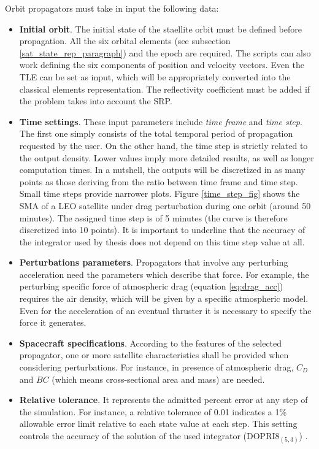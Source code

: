 Orbit propagators must take in input the following data:
\begin{itemize}
    \item \textbf{Initial orbit}. The initial state of the staellite orbit must be defined before propagation.
          All the six orbital elements (see subsection \ref{sat_state_rep_paragraph}) and the epoch are required. 
          The scripts can also work defining the six components of position and velocity vectors.
          Even the TLE can be set as input, which will be appropriately converted into the classical elements representation.  
          The reflectivity coefficient must be added if the problem takes into account the SRP.
    \item \textbf{Time settings}. These input parameters include \textit{time frame} and \textit{time step}.
          The first one simply consists of the total temporal period of propagation requested by the user.
          On the other hand, the time step is strictly related to the output density.
          Lower values imply more detailed results, as well as longer computation times.
          In a nutshell, the outputs will be discretized in as many points as those deriving from the ratio between time frame and time step.
          Small time steps provide narrower plots. 
          Figure \ref{time_step_fig} shows the SMA of a LEO satellite under drag perturbation during one orbit (around 50 minutes). 
          The assigned time step is of 5 minutes (the curve is therefore discretized into 10 points).
          It is important to underline that the accuracy of the integrator used by thesis does not depend on this time step value at all.
    \item \textbf{Perturbations parameters}. Propagators that involve any perturbing acceleration need the parameters which describe that force. 
          For example, the perturbing specific force of atmospheric drag (equation \ref{eq:drag_acc}) requires the air density, which will be given by a specific atmospheric model.
          Even for the acceleration of an eventual thruster it is necessary to specify the force it generates.
    \item \textbf{Spacecraft specifications}. According to the features of the selected propagator, one or more satellite characteristics shall be provided when considering perturbations.
          For instance, in presence of atmospheric drag, $C_D$ and $BC$ (which means cross-sectional area and mass) are needed. 
    \item \textbf{Relative tolerance}. It represents the admitted percent error at any step of the simulation. 
          For instance, a relative tolerance of 0.01 indicates a 1\% allowable error limit relative to each state value at each step.
          This setting controls the accuracy of the solution of the used integrator (DOPRI$8_{(5,3)}$) \cite{rocha2018numerical}.
\end{itemize}

